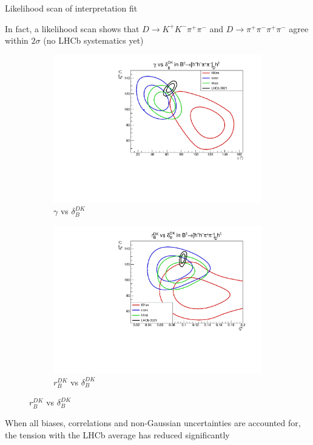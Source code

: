 \documentclass[xcolor={dvipsnames}]{beamer}
\begin{document}
\begin{frame}{Likelihood scan of interpretation fit}
  \begin{center}
    In fact, a likelihood scan shows that $D\to K^+K^-\pi^+\pi^-$ and $D\to\pi^+\pi^-\pi^+\pi^-$ agree within $2\sigma$ (no LHCb systematics yet)
  \end{center}
  \begin{figure}
    \centering
    \begin{subfigure}{0.50\textwidth}
      \centering
      \includegraphics[width=1.0\textwidth]{Plots/gamma_deltaB_hhpipi_LHCb_Prob_scan.pdf}
      \caption*{$\gamma$ vs $\delta_B^{DK}$}
    \end{subfigure}%
    \begin{subfigure}{0.50\textwidth}
      \centering
      \includegraphics[width=1.0\textwidth]{Plots/rB_deltaB_hhpipi_LHCb_Prob_scan.pdf}
      \caption*{$r_B^{DK}$ vs $\delta_B^{DK}$}
    \end{subfigure}
  \end{figure}
  \vspace{-0.3cm}
  \begin{center}
    When all biases, correlations and non-Gaussian uncertainties are accounted for, the tension with the LHCb average has reduced significantly
  \end{center}
\end{frame}
\end{document}

